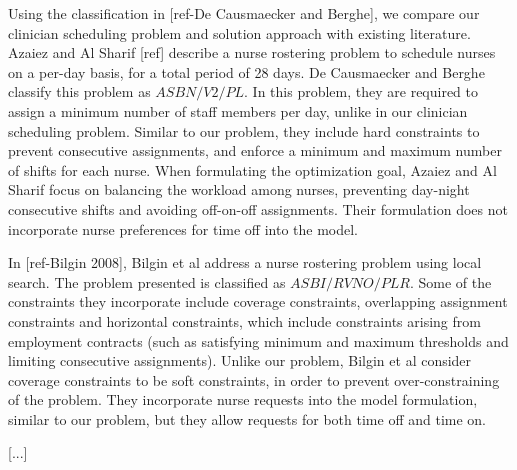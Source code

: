 Using the classification in [ref-De Causmaecker and Berghe], we compare our clinician
scheduling problem and solution approach with existing literature. Azaiez and Al Sharif [ref]
describe a nurse rostering problem to schedule nurses on a per-day basis, for a total period
of 28 days. De Causmaecker and Berghe classify this problem as $ASBN/V2/PL$.
In this problem, they are required to assign a minimum number of staff members
per day, unlike in our clinician scheduling problem. Similar to our problem, they include
hard constraints to prevent consecutive assignments, and enforce a minimum and maximum 
number of shifts for each nurse. When formulating the optimization goal, Azaiez and Al Sharif
focus on balancing the workload among nurses, preventing day-night consecutive shifts and avoiding
off-on-off assignments. Their formulation does not incorporate nurse preferences
for time off into the model. 

In [ref-Bilgin 2008], Bilgin et al address a nurse rostering problem using local search. 
The problem presented is classified as $ASBI/RVNO/PLR$.
Some of the constraints they incorporate include coverage constraints, overlapping assignment
constraints and horizontal constraints, which include constraints arising from employment contracts
(such as satisfying minimum and maximum thresholds and limiting consecutive assignments). Unlike
our problem, Bilgin et al consider coverage constraints to be soft constraints, in order to prevent
over-constraining of the problem. They incorporate nurse requests into the model formulation,
similar to our problem, but they allow requests for both time off and time on.

[...]
